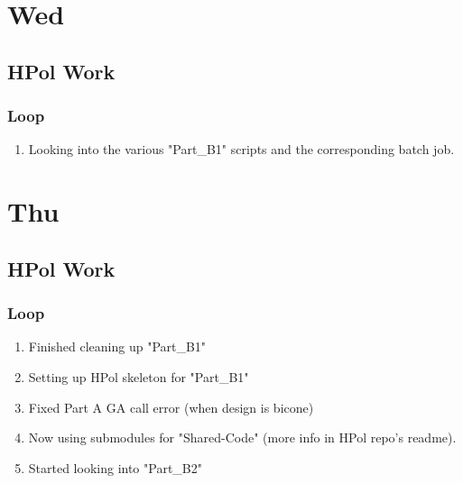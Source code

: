 \documentclass[12pt,letterpaper]{article}
\begin{document}
\section{Wed}
\subsection{HPol Work}
\subsubsection{Loop}
\begin{enumerate}
  \item Looking into the various "Part_B1" scripts and the corresponding batch job.
\end{enumerate}

\section{Thu}
\subsection{HPol Work}
\subsubsection{Loop}
\begin{enumerate}
  \item Finished cleaning up "Part_B1"
  \item Setting up HPol skeleton for "Part_B1"
  \item Fixed Part A GA call error (when design is bicone)
  \item Now using submodules for "Shared-Code" (more info in HPol repo's readme).
  \item Started looking into "Part_B2"
\end{enumerate}
\end{document}
